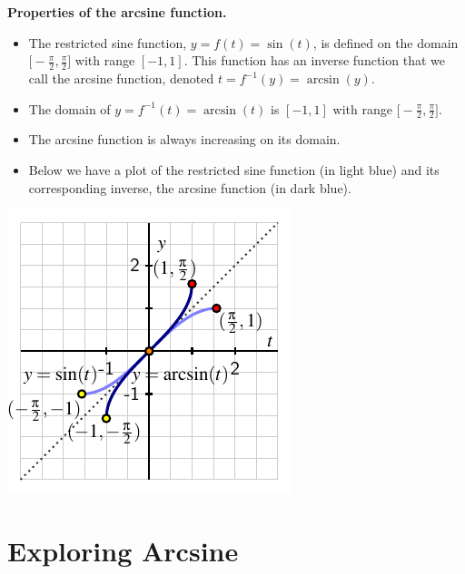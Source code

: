 \documentclass{ximera}
\begin{document}
\begin{callout}{\bf Properties of the arcsine function.}%
\begin{itemize}
\item
The restricted sine function, $y = f(t) = \sin(t)$, is defined on the domain $\Big[\!\!-\!\frac{\pi}{2},\frac{\pi}{2}\Big]$ with range $[-1,1]$.  This function has an inverse function that we call the arcsine function, denoted $t = f^{-1}(y) = \arcsin(y)$.%
\item
The domain of $y = f^{-1}(t) = \arcsin(t)$ is $[-1,1]$ with range $\Big[\!-\!\frac{\pi}{2},\frac{\pi}{2}\Big]$.%
\item
The arcsine function is always increasing on its domain.%
\item
Below we have a plot of the restricted sine function (in light blue) and its corresponding inverse, the arcsine function (in dark blue).%
\end{itemize}
\includegraphics[width=1\linewidth]{inverse-trig-arcsin-graph.pdf}
\end{callout}

\section{Exploring Arcsine}
\end{document}
